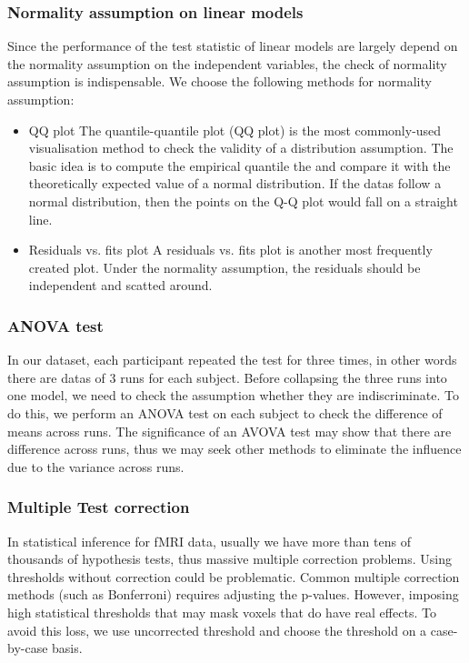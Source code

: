 \documentclass[11pt]{article}
\begin{document}
\subsubsection{Normality assumption on linear models}

Since the performance of the test statistic of linear models are largely depend on the normality assumption on the independent variables, the check of normality assumption is indispensable. We choose the following methods for normality assumption:

\begin{itemize}
\item{QQ plot} The quantile-quantile plot (QQ plot) is the most commonly-used visualisation method to check the validity of a distribution assumption. The basic idea is to compute the empirical quantile the and compare it with the theoretically expected value of a normal distribution. If the datas follow a normal distribution, then the points on the Q-Q plot would fall on a straight line. 
\item{Residuals vs. fits plot} A residuals vs. fits plot is another most frequently created plot. Under the normality assumption, the residuals should be independent and scatted around.
\end{itemize}

\subsubsection{ANOVA test}

In our dataset, each participant repeated the test for three times, in other words there are datas of 3 runs for each subject. Before collapsing the three runs into one model, we need to check the assumption whether they are indiscriminate.  To do this, we perform an ANOVA test on each subject to check the difference of means across runs. The significance of an AVOVA test may show that there are difference across runs, thus we may seek other methods to eliminate the influence due to the variance across runs.

\subsubsection{Multiple Test correction}

In statistical inference for fMRI data, usually we have more than tens of thousands of hypothesis tests, thus massive multiple correction problems. Using thresholds without correction could be problematic. Common multiple correction methods (such as Bonferroni) requires adjusting the p-values. However, imposing high statistical thresholds that may mask voxels that do have real effects. To avoid this loss, we use uncorrected threshold and choose the threshold on a case-by-case basis.
\end{document}
